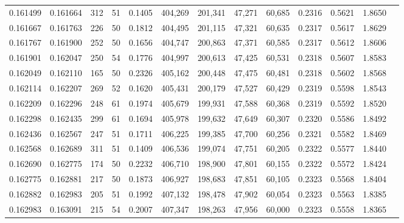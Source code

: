 \begin{tabular}{rrrrrrrrrrrrr}
0.161499 & 0.161664 &   312 &  51 &                                     0.1405 & 404,269 & 201,341 &  47,271 &  60,685 & 0.2316 & 0.5621 & 1.8650 \\
0.161667 & 0.161763 &   226 &  50 &                                     0.1812 & 404,495 & 201,115 &  47,321 &  60,635 & 0.2317 & 0.5617 & 1.8629 \\
0.161767 & 0.161900 &   252 &  50 &                                     0.1656 & 404,747 & 200,863 &  47,371 &  60,585 & 0.2317 & 0.5612 & 1.8606 \\
0.161901 & 0.162047 &   250 &  54 &                                     0.1776 & 404,997 & 200,613 &  47,425 &  60,531 & 0.2318 & 0.5607 & 1.8583 \\
0.162049 & 0.162110 &   165 &  50 &                                     0.2326 & 405,162 & 200,448 &  47,475 &  60,481 & 0.2318 & 0.5602 & 1.8568 \\
0.162114 & 0.162207 &   269 &  52 &                                     0.1620 & 405,431 & 200,179 &  47,527 &  60,429 & 0.2319 & 0.5598 & 1.8543 \\
0.162209 & 0.162296 &   248 &  61 &                                     0.1974 & 405,679 & 199,931 &  47,588 &  60,368 & 0.2319 & 0.5592 & 1.8520 \\
0.162298 & 0.162435 &   299 &  61 &                                     0.1694 & 405,978 & 199,632 &  47,649 &  60,307 & 0.2320 & 0.5586 & 1.8492 \\
0.162436 & 0.162567 &   247 &  51 &                                     0.1711 & 406,225 & 199,385 &  47,700 &  60,256 & 0.2321 & 0.5582 & 1.8469 \\
0.162568 & 0.162689 &   311 &  51 &                                     0.1409 & 406,536 & 199,074 &  47,751 &  60,205 & 0.2322 & 0.5577 & 1.8440 \\
0.162690 & 0.162775 &   174 &  50 &                                     0.2232 & 406,710 & 198,900 &  47,801 &  60,155 & 0.2322 & 0.5572 & 1.8424 \\
0.162775 & 0.162881 &   217 &  50 &                                     0.1873 & 406,927 & 198,683 &  47,851 &  60,105 & 0.2323 & 0.5568 & 1.8404 \\
0.162882 & 0.162983 &   205 &  51 &                                     0.1992 & 407,132 & 198,478 &  47,902 &  60,054 & 0.2323 & 0.5563 & 1.8385 \\
0.162983 & 0.163091 &   215 &  54 &                                     0.2007 & 407,347 & 198,263 &  47,956 &  60,000 & 0.2323 & 0.5558 & 1.8365 \\

\end{tabular}
